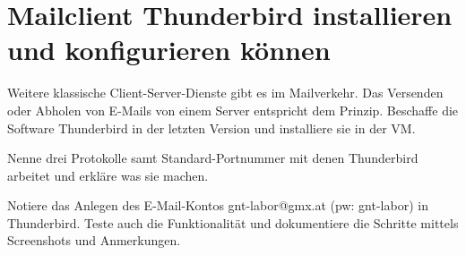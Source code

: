 \chapter{Mailclient Thunderbird installieren und konfigurieren können}
\label{kap:thunderbird}

\begin{aufgabe}
Weitere klassische Client-Server-Dienste gibt es im Mailverkehr. Das Versenden oder Abholen von E-Mails von einem Server entspricht dem Prinzip. Beschaffe die Software Thunderbird in der letzten Version und installiere sie in der VM.
\end{aufgabe}

\begin{aufgabe}
Nenne drei Protokolle samt Standard-Portnummer mit denen Thunderbird arbeitet und erkläre was sie machen.
\end{aufgabe}


\begin{aufgabe}
Notiere das Anlegen des E-Mail-Kontos gnt-labor@gmx.at (pw: gnt-labor) in Thunderbird. Teste auch die Funktionalität und dokumentiere die Schritte mittels Screenshots und Anmerkungen.
\end{aufgabe}

